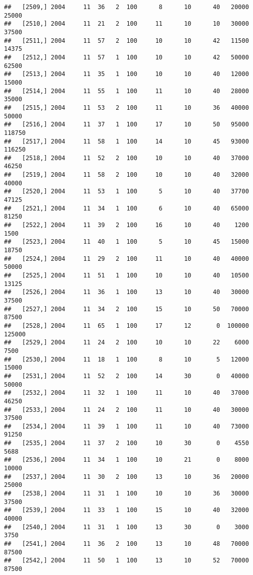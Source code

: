 \documentclass{article}\usepackage[]{graphicx}\usepackage[]{color}
\makeatletter
\newenvironment{kframe}{%
 \def\at@end@of@kframe{}%
 \ifinner\ifhmode%
  \def\at@end@of@kframe{\end{minipage}}%
  \begin{minipage}{\columnwidth}%
 \fi\fi%
 \def\FrameCommand##1{\hskip\@totalleftmargin \hskip-\fboxsep
 \colorbox{shadecolor}{##1}\hskip-\fboxsep
     \hskip-\linewidth \hskip-\@totalleftmargin \hskip\columnwidth}%
 \MakeFramed {\advance\hsize-\width
   \@totalleftmargin\z@ \linewidth\hsize
   \@setminipage}}%
 {\par\unskip\endMakeFramed%
 \at@end@of@kframe}
\newenvironment{knitrout}{}{} %
\makeatother
\begin{document}
\begin{knitrout}
\begin{kframe}
\begin{verbatim}
##   [2509,] 2004     11  36   2  100      8      10      40   20000   25000
##   [2510,] 2004     11  21   2  100     11      10      10   30000   37500
##   [2511,] 2004     11  57   2  100     10      10      42   11500   14375
##   [2512,] 2004     11  57   1  100     10      10      42   50000   62500
##   [2513,] 2004     11  35   1  100     10      10      40   12000   15000
##   [2514,] 2004     11  55   1  100     11      10      40   28000   35000
##   [2515,] 2004     11  53   2  100     11      10      36   40000   50000
##   [2516,] 2004     11  37   1  100     17      10      50   95000  118750
##   [2517,] 2004     11  58   1  100     14      10      45   93000  116250
##   [2518,] 2004     11  52   2  100     10      10      40   37000   46250
##   [2519,] 2004     11  58   2  100     10      10      40   32000   40000
##   [2520,] 2004     11  53   1  100      5      10      40   37700   47125
##   [2521,] 2004     11  34   1  100      6      10      40   65000   81250
##   [2522,] 2004     11  39   2  100     16      10      40    1200    1500
##   [2523,] 2004     11  40   1  100      5      10      45   15000   18750
##   [2524,] 2004     11  29   2  100     11      10      40   40000   50000
##   [2525,] 2004     11  51   1  100     10      10      40   10500   13125
##   [2526,] 2004     11  36   1  100     13      10      40   30000   37500
##   [2527,] 2004     11  34   2  100     15      10      50   70000   87500
##   [2528,] 2004     11  65   1  100     17      12       0  100000  125000
##   [2529,] 2004     11  24   2  100     10      10      22    6000    7500
##   [2530,] 2004     11  18   1  100      8      10       5   12000   15000
##   [2531,] 2004     11  52   2  100     14      30       0   40000   50000
##   [2532,] 2004     11  32   1  100     11      10      40   37000   46250
##   [2533,] 2004     11  24   2  100     11      10      40   30000   37500
##   [2534,] 2004     11  39   1  100     11      10      40   73000   91250
##   [2535,] 2004     11  37   2  100     10      30       0    4550    5688
##   [2536,] 2004     11  34   1  100     10      21       0    8000   10000
##   [2537,] 2004     11  30   2  100     13      10      36   20000   25000
##   [2538,] 2004     11  31   1  100     10      10      36   30000   37500
##   [2539,] 2004     11  33   1  100     15      10      40   32000   40000
##   [2540,] 2004     11  31   1  100     13      30       0    3000    3750
##   [2541,] 2004     11  36   2  100     13      10      48   70000   87500
##   [2542,] 2004     11  50   1  100     13      10      52   70000   87500

\end{verbatim}
\end{kframe}
\end{knitrout}
\end{document}
